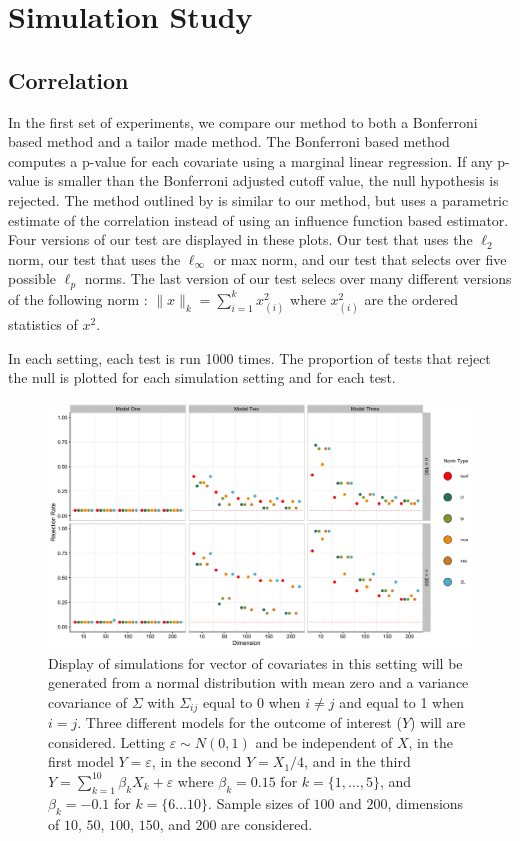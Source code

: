 \documentclass{article}
\begin{document}
\section{Simulation Study}
\label{sec:sim_stdy}

\subsection{Correlation}

In the first set of experiments, we compare our method to both a Bonferroni based method and a tailor made method.  The Bonferroni based method computes a p-value for each covariate using a marginal linear regression.  If any p-value is smaller than the Bonferroni adjusted cutoff value, the null hypothesis is rejected. The method outlined by \citep{zhang_comment_2015} is similar to our method, but uses a parametric estimate of the correlation instead of using an influence function based estimator.  Four versions of our test are displayed in these plots. Our test that uses the $\ell_2$ norm, our test that uses the $\ell_\infty$ or max norm, and our test that selects over five possible $\ell_p$ norms.  The last version of our test selecs over many different versions of the following norm : $\|x\|_k = \sum_{i = 1}^k x_{(i)}^2$ where $x^2_{(i)}$ are the ordered statistics of $x^2$.

In each setting, each test is run 1000 times.  The proportion of tests that reject the null is plotted for each simulation setting and for each test.  

\begin{figure}[]
	\centering
\includegraphics[width = \linewidth]{uncor.jpg}
	\caption{Display of simulations for vector of covariates in this setting will be generated from a normal distribution with mean zero and a variance covariance of $\Sigma$ with $\Sigma_{ij}$ equal to $0$ when $i \neq j$ and equal to 1 when $i = j$. Three different models for the outcome of interest ($Y$) will are considered. Letting $\varepsilon \sim N(0, 1)$ and be independent of $X$, in the first model $Y = \varepsilon$, in the second $Y = X_1 / 4$, and in the third $Y = \sum_{k = 1}^{10} \beta_k X_k + \varepsilon$ where $\beta_k = 0.15$ for $k = \{1, \dots, 5\}$, and $\beta_k = -0.1$ for $k = \{6 \dots 10\}$. Sample sizes of $100$ and $200$, dimensions of $10$, $50$, $100$, $150$, and $200$ are considered.}
	\label{fig:uncor}
\end{figure}
\end{document}
